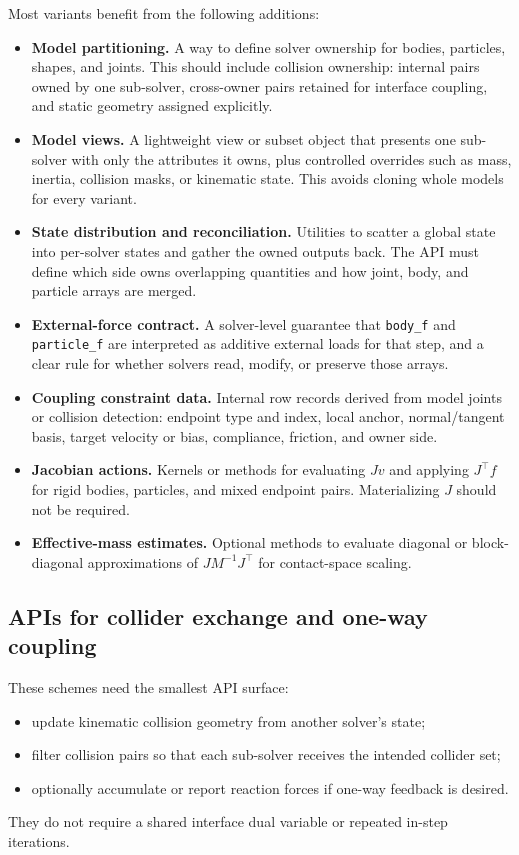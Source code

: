 \documentclass[11pt]{article}
\begin{document}
Most variants benefit from the following additions:
\begin{itemize}
\item \textbf{Model partitioning.} A way to define solver ownership for bodies,
      particles, shapes, and joints. This should include collision ownership:
      internal pairs owned by one sub-solver, cross-owner pairs retained for interface
      coupling, and static geometry assigned explicitly.
\item \textbf{Model views.} A lightweight view or subset object that presents one
      sub-solver with only the attributes it owns, plus controlled overrides such as
      mass, inertia, collision masks, or kinematic state. This avoids cloning whole
      models for every variant.
\item \textbf{State distribution and reconciliation.} Utilities to scatter a global
      state into per-solver states and gather the owned outputs back. The API must
      define which side owns overlapping quantities and how joint, body, and particle
      arrays are merged.
\item \textbf{External-force contract.} A solver-level guarantee that
      \texttt{body\_f} and \texttt{particle\_f} are interpreted as additive external
      loads for that step, and a clear rule for whether solvers read, modify, or
      preserve those arrays.
\item \textbf{Coupling constraint data.} Internal row records derived from model
      joints or collision detection: endpoint type and index, local anchor,
      normal/tangent basis, target velocity or bias, compliance, friction, and
      owner side.
\item \textbf{Jacobian actions.} Kernels or methods for evaluating $Jv$ and applying
      $J^\top f$ for rigid bodies, particles, and mixed endpoint pairs.
      Materializing $J$ should not be required.
\item \textbf{Effective-mass estimates.} Optional methods to evaluate diagonal or
      block-diagonal approximations of $J M^{-1} J^\top$ for contact-space scaling.
\end{itemize}

\subsection{APIs for collider exchange and one-way coupling}

These schemes need the smallest API surface:
\begin{itemize}
\item update kinematic collision geometry from another solver's state;
\item filter collision pairs so that each sub-solver receives the intended collider
      set;
\item optionally accumulate or report reaction forces if one-way feedback is desired.
\end{itemize}
They do not require a shared interface dual variable or repeated in-step iterations.
\end{document}
